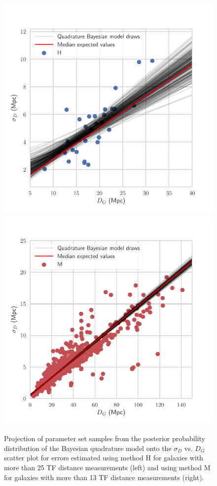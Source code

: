 \documentclass[a4paper,fleqn,usenatbib]{mnras}
\begin{document}
\begin{figure}
	\includegraphics[scale=0.69]{drawsq}
	\includegraphics[scale=0.69]{drawsq2}
    \caption{Projection of parameter set samples from the posterior probability distribution of the Bayesian quadrature model onto the  $\sigma_D$ vs. $D_G$ scatter plot for errors estimated using method H for galaxies with more than 25 TF distance measurements (left) and using method M for galaxies with more than 13 TF distance measurements (right).}
    \label{fig:drawsq}
\end{figure}
\end{document}
